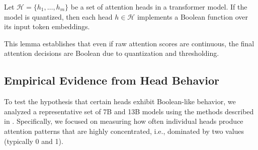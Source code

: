 \begin{lemma}






\label{lem:boolean-heads}






Let $\mathcal{H} = \{h_1, \dots, h_m\}$ be a set of attention heads in a transformer model. If the model is quantized, then each head $h \in \mathcal{H}$ implements a Boolean function over its input token embeddings.






\end{lemma}













This lemma establishes that even if raw attention scores are continuous, the final attention decisions are Boolean due to quantization and thresholding.













\subsection{Empirical Evidence from Head Behavior}













To test the hypothesis that certain heads exhibit Boolean-like behavior, we analyzed a representative set of 7B and 13B models using the methods described in \cite{mimo2024}. Specifically, we focused on measuring how often individual heads produce attention patterns that are highly concentrated, i.e., dominated by two values (typically 0 and 1). 













